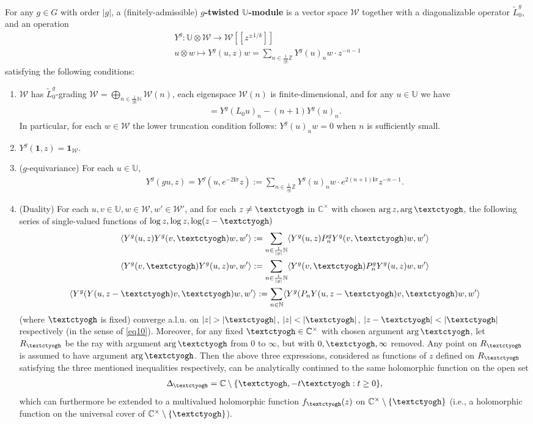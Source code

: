 \documentclass[11pt,b5paper,notitlepage]{article}
\theoremstyle{definition}
\theoremstyle{plain}
\newcommand{\mc}{\mathcal}
\newcommand{\wtd}{\widetilde}
\newcommand{\id}{\mathbf{1}}
\newcommand{\bk}[1]{\langle {#1}\rangle}
\newcommand{\im}{\mathbf{i}}
\newcommand{\Ubb}{\mathbb U}
\newcommand{\Cbb}{\mathbb C}
\newcommand{\Nbb}{\mathbb N}
\newcommand{\Zbb}{\mathbb Z}
\newcommand{\tipaz}{\text{\textctyogh}}
\numberwithin{equation}{subsection}
\begin{document}
For any $g\in G$ with order $|g|$, a (finitely-admissible)  \textbf{$g$-twisted $\Ubb$-module} is a vector space $\mc W$ together with a diagonalizable operator $\wtd L_0^g$, and an operation
\begin{gather*}
Y^g:\Ubb\otimes\mc W\rightarrow	\mc W[[z^{\pm 1/k}]]\\
u\otimes w\mapsto Y^g(u,z)w=\sum_{n\in \frac 1{|g|} \Zbb}Y^g(u)_nw\cdot z^{-n-1}
\end{gather*}
satisfying the following conditions:
\begin{enumerate}
\item $\mc W$ has $\wtd L_0^g$-grading \index{L0g@$\wtd L_0^g$} $\mc W=\bigoplus_{n\in\frac 1{|g|}\Nbb}\mc W(n)$, each eigenspace $\mc W(n)$ is finite-dimensional, and for any $u\in\Ubb$ we have
\begin{align}
[\wtd L_0^g,Y^g(u)_n]=Y^g(L_0u)_n-(n+1)Y^g(u)_n.\label{eq12}	
\end{align}
In particular, for each $w\in\mc W$ the lower truncation condition follows: $Y^g(u)_nw=0$ when $n$ is sufficiently small.
\item $Y^g(\id,z)=\id_{\mc W}$.
\item ($g$-equivariance) For each $u\in\Ubb$,
\begin{align}
Y^g(gu,z)=Y^g(u,e^{-2\im\pi}z):=\sum_{n\in \frac 1{|g|} \Zbb}Y^g(u)_nw\cdot e^{2(n+1)\im\pi}z^{-n-1}.\label{eq21}
\end{align}
\item (Duality)  For each $u,v\in\Ubb,w\in\mc W,w'\in\mc W'$, and for each $z\neq \tipaz$ in $\Cbb^\times$ with chosen $\arg z,\arg \tipaz$, the following series of single-valued functions of $\log z,\log z,\log(z-\tipaz)$
\begin{gather}
\bk{Y^g(u,z)Y^g(v,\tipaz)w,w'}:=\sum_{n\in\frac 1{|g|}\Nbb}	\bk{Y^g(u,z)P_n^gY^g(v,\tipaz)w,w'}\label{eq13}\\
\bk{Y^g(v,\tipaz)Y^g(u,z)w,w'}:=\sum_{n\in\frac 1{|g|}\Nbb}	\bk{Y^g(v,\tipaz)P_n^gY^g(u,z)w,w'}\label{eq14}\\
\bk{Y^g(Y(u,z-\tipaz)v,\tipaz)w,w'}:=\sum_{n\in\Nbb}	\bk{Y^g(P_nY(u,z-\tipaz)v,\tipaz)w,w'}\label{eq15}
\end{gather}
(where $\tipaz$ is fixed) converge a.l.u.  on $|z|>|\tipaz|$, $|z|<|\tipaz|$, $|z-\tipaz|<|\tipaz|$ respectively (in the sense of \eqref{eq10}). Moreover, for any fixed $\tipaz\in\Cbb^\times$ with chosen argument $\arg \tipaz$, let $R_{\tipaz}$ be the ray with argument $\arg \tipaz$ from $0$ to $\infty$, but with $0,\tipaz,\infty$ removed. Any point on $R_{\tipaz}$ is assumed to have argument $\arg \tipaz$. Then the above three expressions, considered as functions of $z$ defined on $R_{\tipaz}$ satisfying the three mentioned inequalities respectively, can be analytically continued to the same holomorphic function on the open set
\begin{align*}
\Updelta_\tipaz=\Cbb\setminus\{\tipaz,-t\tipaz:t\geq 0\},
\end{align*}
which can furthermore be extended to a multivalued holomorphic function $f_{\tipaz}(z)$ on $\Cbb^\times\setminus\{\tipaz\}$ (i.e., a holomorphic function on the universal cover of $\Cbb^\times\setminus\{\tipaz\}$).
\end{enumerate}
\end{document}
